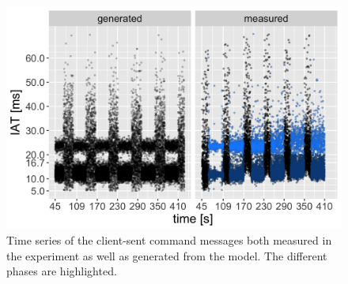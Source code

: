 \begin{figure}[t]
	\centering
	\includegraphics[width=1.0\columnwidth]{images/command-ts-annotated.png}
	\caption{Time series of the client-sent command messages both measured in the experiment as well as generated from the model. The different phases are highlighted.}
\label{fig:command-timeseries}
\end{figure}






